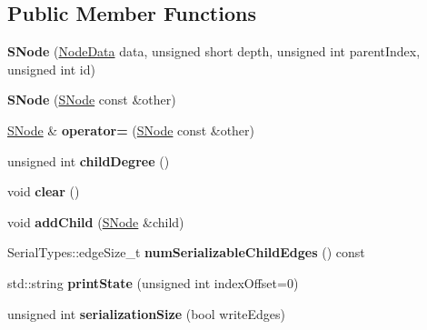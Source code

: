 \subsection*{Public Member Functions}
\begin{DoxyCompactItemize}
\item 
\mbox{\label{classSNode_a7cd288a6ea2179ffd8e4ef01c92f6aee}} 
{\bfseries S\+Node} (\mbox{\hyperlink{structNodeData}{Node\+Data}} data, unsigned short depth, unsigned int parent\+Index, unsigned int id)
\item 
\mbox{\label{classSNode_a707caa3815440ea5d9edfbaaa505a29f}} 
{\bfseries S\+Node} (\mbox{\hyperlink{classSNode}{S\+Node}} const \&other)
\item 
\mbox{\label{classSNode_ad52dc3ce662771f54aaf2180d3099c2c}} 
\mbox{\hyperlink{classSNode}{S\+Node}} \& {\bfseries operator=} (\mbox{\hyperlink{classSNode}{S\+Node}} const \&other)
\item 
\mbox{\label{classSNode_aff2a32c3e062db60cf51ad8b0aa20a8f}} 
unsigned int {\bfseries child\+Degree} ()
\item 
\mbox{\label{classSNode_ad1b31b259cf58780a3dfa9f69cb87a39}} 
void {\bfseries clear} ()
\item 
\mbox{\label{classSNode_afd3ce18f8cd768767dd8a14f9d2047aa}} 
void {\bfseries add\+Child} (\mbox{\hyperlink{classSNode}{S\+Node}} \&child)
\item 
\mbox{\label{classSNode_a7312a8bc85e4c62a441e438a8785ffc2}} 
Serial\+Types\+::edge\+Size\+\_\+t {\bfseries num\+Serializable\+Child\+Edges} () const
\item 
\mbox{\label{classSNode_aea595403db954100de3fa5da6d5a10f1}} 
std\+::string {\bfseries print\+State} (unsigned int index\+Offset=0)
\item 
\mbox{\label{classSNode_a0b2284b23a9503526bf4b43725d5c279}} 
unsigned int {\bfseries serialization\+Size} (bool write\+Edges)
\item 
\mbox{\label{classSNode_aaa10282cc32094fc874d7376c2d0837a}} 

\end{DoxyCompactItemize}
